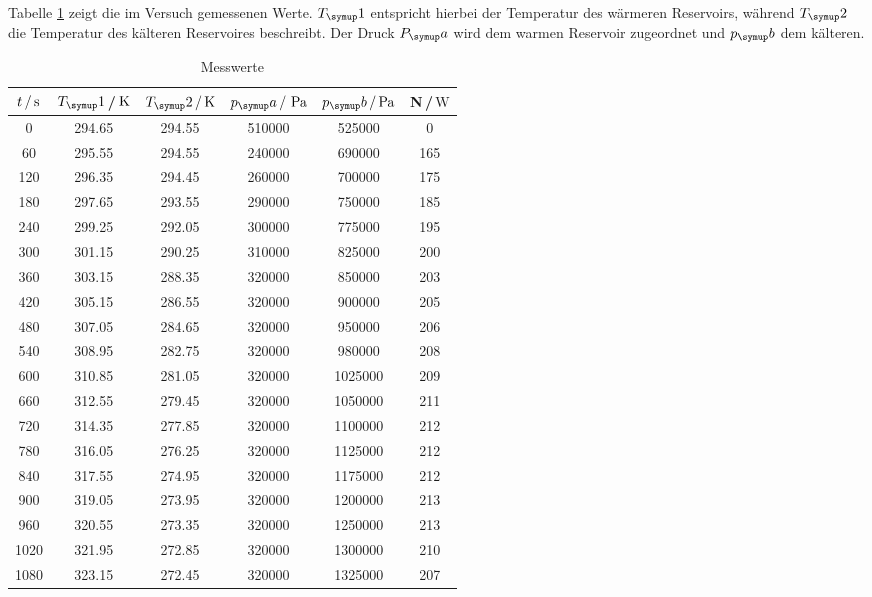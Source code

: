 Tabelle \ref{tab:messwerte} zeigt die im Versuch gemessenen Werte.
$T_\su{1}$ entspricht hierbei der Temperatur des wärmeren Reservoirs, während $T_\su{2}$
die Temperatur des kälteren Reservoires beschreibt. Der Druck $P_\su{a}$ wird dem warmen Reservoir
zugeordnet und $p_\su{b}$ dem kälteren.
\begin{table}[h]
  \centering
  \begin{tabular}{c c c c c c}
    \toprule
    $t\,/\,\si{\second}$ &$T_\su{1}$\,/$\,\si{\kelvin}$ & $T_\su{2}\,/\Kel$ & $p_\su{a}\,/\,\pas $ &
    $p_\su{b}\,/ \pas$ & N\,/$\,\si{\watt}$  \\
    \midrule
       0   &   294.65   &   294.55   &   510000    &     525000   &      0 \\
      60   &   295.55   &   294.55   &   240000    &     690000   &    165 \\
     120   &   296.35   &   294.45   &   260000    &     700000   &    175 \\
     180   &   297.65   &   293.55   &   290000    &     750000   &    185 \\
     240   &   299.25   &   292.05   &   300000    &     775000   &    195 \\
     300   &   301.15   &   290.25   &   310000    &     825000   &    200 \\
     360   &   303.15   &   288.35   &   320000    &     850000   &    203 \\
     420   &   305.15   &   286.55   &   320000    &     900000   &    205 \\
     480   &   307.05   &   284.65   &   320000    &     950000   &    206 \\
     540   &   308.95   &   282.75   &   320000    &     980000   &    208 \\
     600   &   310.85   &   281.05   &   320000    &    1025000   &    209 \\
     660   &   312.55   &   279.45   &   320000    &    1050000   &    211 \\
     720   &   314.35   &   277.85   &   320000    &    1100000   &    212 \\
     780   &   316.05   &   276.25   &   320000    &    1125000   &    212 \\
     840   &   317.55   &   274.95   &   320000    &    1175000   &    212 \\
     900   &   319.05   &   273.95   &   320000    &    1200000   &    213 \\
     960   &   320.55   &   273.35   &   320000    &    1250000   &    213 \\
    1020   &   321.95   &   272.85   &   320000    &    1300000   &    210 \\
    1080   &   323.15   &   272.45   &   320000    &    1325000   &    207 \\
    \bottomrule
  \end{tabular}
  \caption{Messwerte}
  \label{tab:messwerte}
\end{table}
